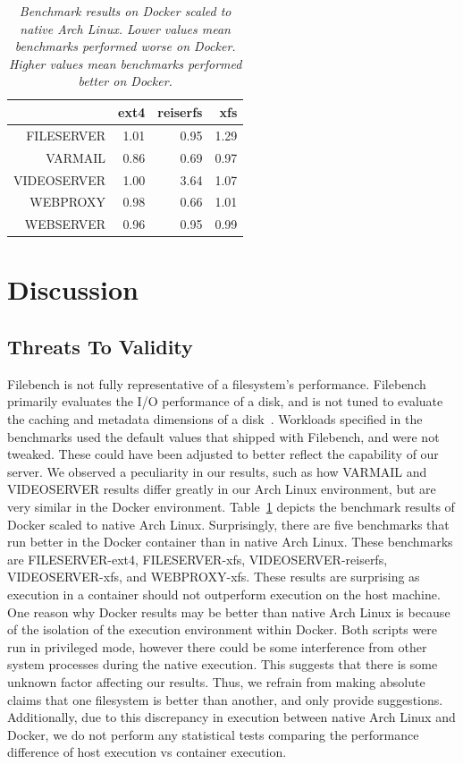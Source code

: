 \documentclass[letterpaper,twocolumn,10pt]{article}
\begin{document}
\begin{table}[!ht]
\centering
\begin{tabular}{rrrr}
  \hline
 & ext4 & reiserfs & xfs \\ 
  \hline
FILESERVER & 1.01 & 0.95 & 1.29 \\ 
  VARMAIL & 0.86 & 0.69 & 0.97 \\ 
  VIDEOSERVER & 1.00 & 3.64 & 1.07 \\ 
  WEBPROXY & 0.98 & 0.66 & 1.01 \\ 
  WEBSERVER & 0.96 & 0.95 & 0.99 \\ 
   \hline
\end{tabular}
\caption{\textit{Benchmark results on Docker scaled to native Arch Linux. Lower values mean benchmarks performed worse on Docker. Higher values mean benchmarks performed better on Docker.}}
\label{tab:dock_relative_arch}
\end{table}


\section{Discussion}\label{Discussion}
\subsection{Threats To Validity}
Filebench is not fully representative of a filesystem's performance. Filebench primarily evaluates the I/O performance of a disk, and is not tuned to evaluate the caching and metadata dimensions of a disk~\cite{tarasov2011benchmarking}. Workloads specified in the benchmarks used the default values that shipped with Filebench, and were not tweaked. These could have been adjusted to better reflect the capability of our server. 
We observed a peculiarity in our results, such as how VARMAIL and VIDEOSERVER results differ greatly in our Arch Linux environment, but are very similar in the Docker environment. Table~\ref{tab:dock_relative_arch} depicts the benchmark results of Docker scaled to native Arch Linux. Surprisingly, there are five benchmarks that run better in the Docker container than in native Arch Linux. These benchmarks are FILESERVER-ext4, FILESERVER-xfs, VIDEOSERVER-reiserfs, VIDEOSERVER-xfs, and WEBPROXY-xfs. These results are surprising as execution in a container should not outperform execution on the host machine. One reason why Docker results may be better than native Arch Linux is because of the isolation of the execution environment within Docker. Both scripts were run in privileged mode, however there could be some interference from other system processes during the native execution. This suggests that there is some unknown factor affecting our results. Thus, we refrain from making absolute claims that one filesystem is better than another, and only provide suggestions. Additionally, due to this discrepancy in execution between native Arch Linux and Docker, we do not perform any statistical tests comparing the performance difference of host execution vs container execution. 
\end{document}
